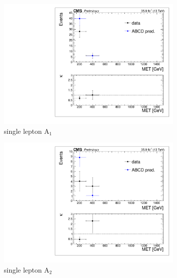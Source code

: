 \begin{figure}[hbp!]
\begin{subfigure}[b]{0.425\textwidth}
\includegraphics[trim={5px 5px 5px 5px},clip,width=\textwidth]{figs/SUS17006/dataClosure_single-tagSR_singleLep.pdf} 
\caption{single lepton A$_{1}$}
\end{subfigure}
\begin{subfigure}[b]{0.425\textwidth}
\includegraphics[trim={5px 5px 5px 5px},clip,width=\textwidth]{figs/SUS17006/dataClosure_double-tagSR_singleLep.pdf} 
\caption{single lepton A$_{2}$}
\end{subfigure}
\vspace{5mm}
\\
\begin{subfigure}[b]{0.425\textwidth}

\end{subfigure}
\end{figure}
